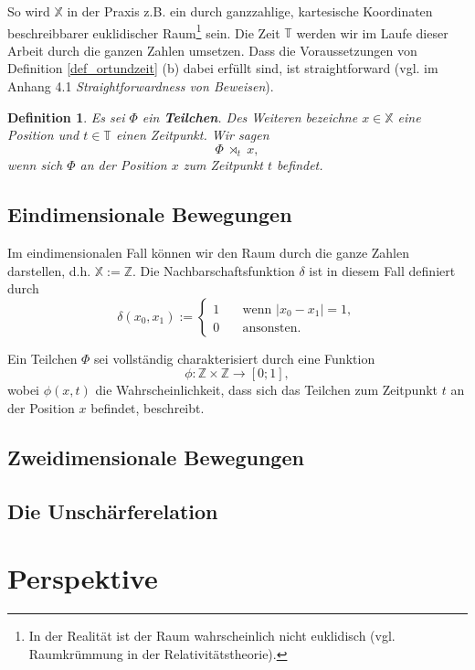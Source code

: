 \documentclass[a4paper,12pt,ngerman]{scrartcl}
\theoremstyle{plain}
\newtheorem{definition}{Definition}
\theoremstyle{plain}
\newcommand{\Z}{\mathbb{Z}}
\newcommand{\T}{\mathbb{T}}
\newcommand{\X}{\mathbb{X}}
\begin{document}
So wird $\X$ in der Praxis z.B. ein durch ganzzahlige, kartesische Koordinaten beschreibbarer euklidischer Raum\footnote{In der Realität ist der Raum wahrscheinlich nicht euklidisch (vgl. Raumkrümmung in der Relativitätstheorie).} sein. Die Zeit $\T$ werden wir im Laufe dieser Arbeit durch die ganzen Zahlen umsetzen. Dass die Voraussetzungen von Definition \ref{def_ortundzeit} (b) dabei erfüllt sind, ist straightforward (vgl. im Anhang 4.1 \textit{Straightforwardness von Beweisen}).


\begin{definition}
Es sei $\Phi$ ein \textbf{Teilchen}. Des Weiteren bezeichne $x\in\X$ eine Position und $t\in\T$ einen Zeitpunkt. Wir sagen
\[\Phi \;\rtimes_t\; x,\]
wenn sich $\Phi$ an der Position $x$ zum Zeitpunkt $t$ befindet.
\end{definition}

\subsection{Eindimensionale Bewegungen}

Im eindimensionalen Fall können wir den Raum durch die ganze Zahlen darstellen, d.h. $\X := \Z$. Die Nachbarschaftsfunktion $\delta$ ist in diesem Fall definiert durch 
\[\delta(x_0,x_1):=\begin{cases}
1 \quad&\mbox{wenn } |x_0-x_1|=1,\\
0 \quad&\mbox{ansonsten.}
\end{cases}\]



Ein Teilchen $\Phi$ sei vollständig charakterisiert durch eine Funktion \[\phi: \Z \times \Z \rightarrow [ 0;1],\]
wobei $\phi(x,t)$ die Wahrscheinlichkeit, dass sich das Teilchen zum Zeitpunkt $t$ an der Position $x$ befindet, beschreibt.

\subsection{Zweidimensionale Bewegungen}

\subsection{Die Unschärferelation}

\section{Perspektive}
\end{document}
